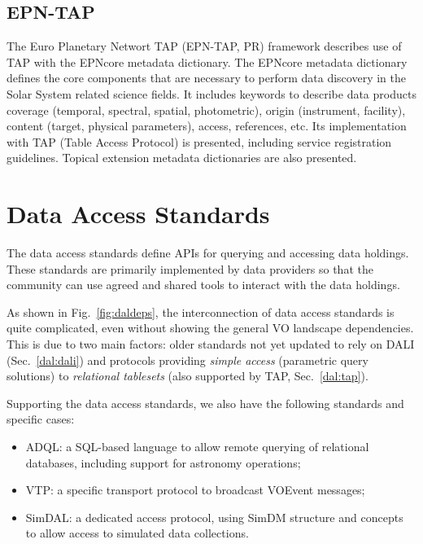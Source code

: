 \documentclass[11pt,a4paper]{ivoa}
\begin{document}
\subsection{EPN-TAP}

The Euro Planetary Networt TAP (EPN-TAP, PR) framework describes use of TAP with the EPNcore metadata dictionary. The EPNcore 
metadata dictionary defines the core components that are necessary to perform data discovery 
in the Solar System related science fields. It includes keywords to describe data products 
coverage (temporal, spectral, spatial, photometric), origin (instrument, facility), content 
(target, physical parameters), access, references, etc. Its implementation with TAP (Table 
Access Protocol) is presented, including service registration guidelines. Topical extension 
metadata dictionaries are also presented. 

\section{Data Access Standards}
\label{dal}

The data access standards define APIs for querying and accessing data holdings.
These standards are primarily implemented by data providers so that the community 
can use agreed and shared tools to interact with the data holdings.

As shown in Fig.~\ref{fig:daldeps}, the interconnection of data
access standards is quite complicated, even without showing the general VO landscape 
dependencies. This is due to two main
factors: older standards not yet updated to rely on DALI (Sec.~\ref{dal:dali})
and protocols providing \textit{simple access} (parametric query solutions) to
\textit{relational tablesets} (also supported by TAP, Sec.~\ref{dal:tap}).

Supporting the data access standards, we also have the following standards and specific cases:
\begin{itemize}
	\item ADQL: a SQL-based language to allow remote querying of relational databases, including support for astronomy operations;
	\item VTP: a specific transport protocol to broadcast VOEvent
messages;
	\item SimDAL: a dedicated access protocol, using SimDM structure and
concepts to allow access to simulated data collections.
\end{itemize}
\end{document}
